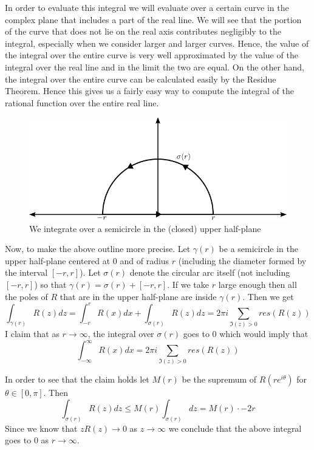 In order to evaluate this integral we will evaluate over a certain curve in the complex plane that includes a part of the real line. We will see that the portion of the curve that does not lie on the real axis contributes negligibly to the integral, especially when we consider larger and larger curves. Hence, the value of the integral over the entire curve is very well approximated by the value of the integral over the real line and in the limit the two are equal. On the other hand, the integral over the entire curve can be calculated easily by the Residue Theorem. Hence this gives us a fairly easy way to compute the integral of the rational function over the entire real line.

\begin{figure}[ht]
    \centering
    \includegraphics{Images/real_line_contour.png}
    \caption{We integrate over a semicircle in the (closed) upper half-plane}
    \label{fig:real-line-contour}
\end{figure}

Now, to make the above outline more precise. Let $\gamma(r)$ be a semicircle in the upper half-plane centered at 0 and of radius $r$ (including the diameter formed by the interval $[-r, r]$). Let $\sigma(r)$ denote the circular arc itself (not including $[-r, r]$) so that $\gamma(r) = \sigma(r) + [-r, r]$. 
If we take $r$ large enough then all the poles of $R$ that are in the upper half-plane are inside $\gamma(r)$. Then we get 
$$\int_{\gamma(r)} R(z) dz = \int_{-r}^r R(x) dx + \int_{\sigma(r)} R(z) dz = 2\pi i \sum_{\Im(z) > 0} res(R(z))$$
I claim that as $r \to \infty$, the integral over $\sigma(r)$ goes to 0 which would imply that
$$\int_{-\infty}^\infty R(x) dx = 2\pi i \sum_{\Im(z) > 0} res(R(z))$$

In order to see that the claim holds let $M(r)$ be the supremum of $R(re^{i \theta})$ for $\theta \in [0, \pi]$. Then
$$ \int_{\sigma(r)} R(z) dz \leq M(r) \int_{\sigma(r)} dz = M(r) \cdot -2r $$
Since we know that $zR(z) \to 0$ as $z \to \infty$ we conclude that the above integral goes to 0 as $r \to \infty$. 

